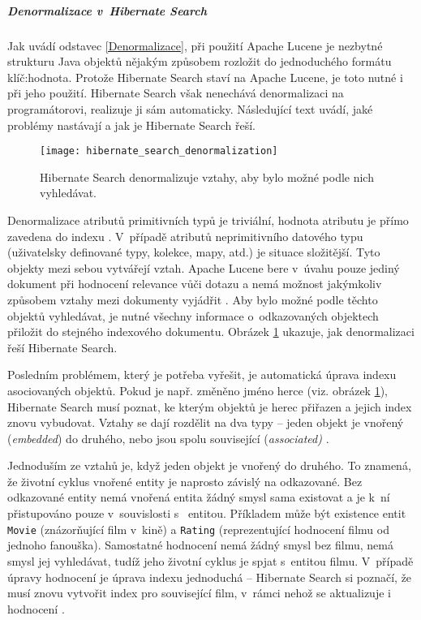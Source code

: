 \documentclass[11pt,oneside]{fithesis2}
\begin{document}
\subparagraph{Denormalizace v~Hibernate Search} 
\label{HibernateSearchDenormalizace}
Jak uvádí odstavec \ref{Denormalizace}, při použití Apache Lucene je nezbytné strukturu Java objektů nějakým způsobem rozložit do jednoduchého formátu klíč:hodnota. Protože Hibernate Search staví na Apache Lucene, je toto nutné i při jeho použití. Hibernate Search však nenechává denormalizaci na programátorovi, realizuje ji sám automaticky. Následující text uvádí, jaké problémy nastávají a jak je Hibernate Search řeší.

\begin{figure}[h!]
	\begin{center}
		\texttt{[image: hibernate\_search\_denormalization]}
	\end{center}
	\caption{Hibernate Search denormalizuje vztahy, aby bylo možné podle nich vyhledávat.}	
	\label{HibernateSearchDenormalizationExample}
\end{figure}

Denormalizace atributů primitivních typů je triviální, hodnota atributu je přímo zavedena do indexu \cite[str. 76]{HibernateSearchAction}. V~případě atributů neprimitivního datového typu (uživatelsky definované typy, kolekce, mapy, atd.) je situace složitější. Tyto objekty mezi sebou vytvářejí vztah. Apache Lucene bere v~úvahu pouze jediný dokument při hodnocení relevance vůči dotazu a nemá možnost jakýmkoliv způsobem vztahy mezi dokumenty vyjádřit \cite[str. 105]{HibernateSearchAction}. Aby bylo možné podle těchto objektů vyhledávat, je nutné všechny informace o~odkazovaných objektech přiložit do stejného indexového dokumentu. Obrázek \ref{HibernateSearchDenormalizationExample} ukazuje, jak denormalizaci řeší Hibernate Search.

Posledním problémem, který je potřeba vyřešit, je automatická úprava indexu asociovaných objektů. Pokud je např. změněno jméno herce (viz. obrázek \ref{HibernateSearchDenormalizationExample}), Hibernate Search musí poznat, ke kterým objektů je herec přiřazen a jejich index znovu vybudovat. Vztahy se dají rozdělit na dva typy -- jeden objekt je vnořený (\emph{embedded}) do druhého, nebo jsou spolu související (\emph{associated)} \cite[str. 107, 110]{HibernateSearchAction}. 

Jednoduším ze vztahů je, když jeden objekt je vnořený do druhého. To znamená, že životní cyklus vnořené entity je naprosto závislý na odkazované. Bez odkazované entity nemá vnořená entita žádný smysl sama existovat a je k~ní přistupováno pouze v~souvislosti s~ entitou. Příkladem může být existence entit \texttt{Movie} (znázorňující film v~kině) a \texttt{Rating} (reprezentující hodnocení filmu od jednoho fanouška). Samostatné hodnocení nemá žádný smysl bez filmu, nemá smysl jej vyhledávat, tudíž jeho životní cyklus je spjat s~entitou filmu. V~případě úpravy hodnocení je úprava indexu jednoduchá -- Hibernate Search si poznačí, že musí znovu vytvořit index pro související film, v~rámci nehož se aktualizuje i hodnocení \cite[str. 108]{HibernateSearchAction}.
\end{document}
